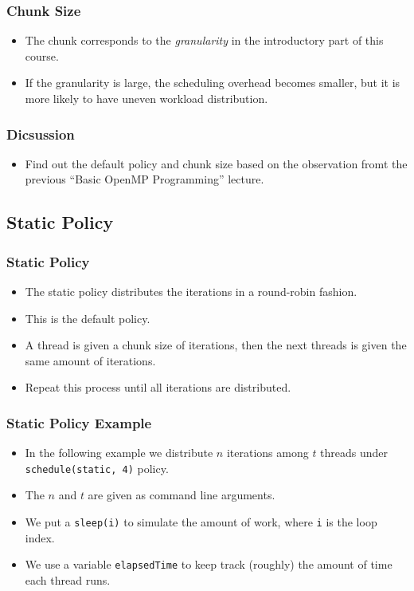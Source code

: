 \documentclass{beamer}
\begin{document}
\begin{frame}
  \frametitle{Chunk Size}
  \begin{itemize}
  \item The chunk corresponds to the {\em granularity} in the
    introductory part of this course.
  \item If the granularity is large, the scheduling overhead becomes
    smaller, but it is more likely to have uneven workload distribution.
  \end{itemize}
\end{frame}

\begin{frame}
\frametitle{Dicsussion}
\begin{itemize}
\item Find out the default policy and chunk size based on the
  observation fromt the previous ``Basic OpenMP Programming'' lecture.
\end{itemize}
\end{frame}


\subsection{Static Policy}

\begin{frame}
  \frametitle{Static Policy}
  \begin{itemize}
  \item The static policy distributes the iterations in a round-robin
    fashion.
  \item This is the default policy.
  \item A thread is given a chunk size of iterations, then the next
    threads is given the same amount of iterations.
  \item Repeat this process until all iterations are distributed.
  \end{itemize}
\end{frame}

\begin{frame}
  \frametitle{Static Policy Example}
  \begin{itemize}
  \item In the following example we distribute $n$ iterations among $t$
    threads under {\tt schedule(static, 4)} policy.
  \item The $n$ and $t$ are given as command line arguments.
  \item We put a {\tt sleep(i)} to simulate the amount of work, where
    {\tt i} is the loop index.
  \item We use a variable {\tt elapsedTime} to keep track (roughly)
    the amount of time each thread runs.
  \end{itemize}
\end{frame}
\end{document}
